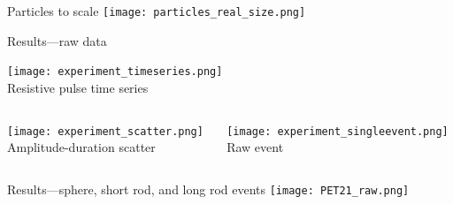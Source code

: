 \begin{frame}[c]{Particles to scale}
	\texttt{[image: particles\_real\_size.png]}
\end{frame}


\begin{frame}[c]{Results---raw data}

	{\centering
		\texttt{[image: experiment\_timeseries.png]} \\
		Resistive pulse time series \\
		\par
	}
	
	\begin{columns}[t]
		\begin{column}[T]{2.25in}
			{\centering
				\texttt{[image: experiment\_scatter.png]} \\
				Amplitude-duration scatter
				\par
			}
		\end{column}
		
		\begin{column}[T]{2.25in}
			{\centering
				\texttt{[image: experiment\_singleevent.png]} \\
				Raw event \\
				\par
			}
		\end{column}

	\end{columns}
	
\end{frame}






 
 \begin{frame}[c]{Results---sphere, short rod, and long rod events}
 	\texttt{[image: PET21\_raw.png]}
 \end{frame}

 
% 




